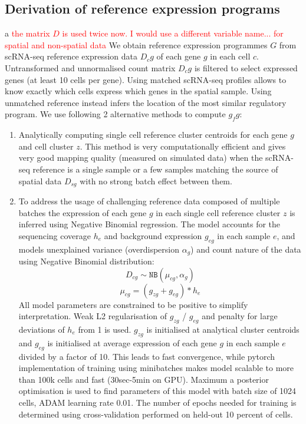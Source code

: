 \documentclass[11pt,a4paper]{article}
\newcommand{\red}{\textcolor{red}}
\begin{document}
\subsection{Derivation of reference expression programs} \label{c2l_ref_prog}a
\red{the matrix $D$ is used twice now. I would use a different variable name... for spatial and non-spatial data}
We obtain reference expression programmes $G$ from scRNA-seq reference expression data $D_cg$ of each gene $g$ in each cell $c$. Untransformed and unnormalised count matrix $D_cg$ is filtered to select expressed genes (at least 10 cells per gene). Using matched scRNA-seq profiles allows to know exactly which cells express which genes in the spatial sample. Using unmatched reference instead infers the location of the most similar regulatory program. We use following 2 alternative methods to compute $g_fg$:
\begin{enumerate}
    \item Analytically computing single cell reference cluster centroids for each gene $g$ and cell cluster $z$. This method is very computationally efficient and gives very good mapping quality (measured on simulated data) when the scRNA-seq reference is a single sample or a few samples matching the source of spatial data $D_{sg}$ with no strong batch effect between them.
    \item To address the usage of challenging reference data composed of multiple batches the expression of each gene $g$ in each single cell reference cluster $z$ is inferred using Negative Binomial regression. The model accounts for the sequencing coverage $h_e$ and background expression $g_{eg}$ in each sample $e$, and models unexplained variance (overdispersion $\alpha_g$) and count nature of the data using Negative Binomial distribution:
    \begin{equation} \label{eq:c2l_ref_prog:1}
    D_{cg} \sim \mathtt{NB}(\mu_{cg}, \alpha_g)
    \end{equation}
    \begin{equation} \label{eq:c2l_ref_prog:2}
    \mu_{cg} = (g_{zg} + g_{eg}) * {h_e}
    \end{equation}
    All model parameters are constrained to be positive to simplify interpretation. Weak L2 regularisation of $g_{zg}$ / $g_{eg}$ and penalty for large deviations of $h_e$ from 1 is used. $g_{zg}$ is initialised at analytical cluster centroids and $g_{eg}$ is initialised at average expression of each gene $g$ in each sample $e$ divided by a factor of 10. This leads to fast convergence, while pytorch implementation of training using minibatches makes model scalable to more than 100k cells and fast (30sec-5min on GPU). Maximum a posterior optimisation is used to find parameters of this model with batch size of 1024 cells, ADAM learning rate 0.01. The number of epochs needed for training is determined using cross-validation performed on held-out 10 percent of cells. \newline

\end{enumerate}
\end{document}

